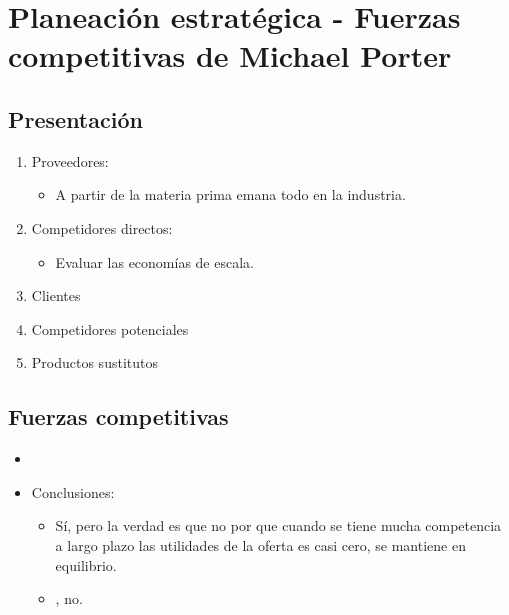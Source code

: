 \section{Planeación estratégica - Fuerzas competitivas de Michael Porter}
\subsection{Presentación}
\begin{enumerate}
    \item Proveedores: 
        \begin{itemize}
            \item A partir de la materia prima emana todo en la industria. 
        \end{itemize}
    
    \item Competidores directos: 
        \begin{itemize}
            \item Evaluar las economías de escala.
        \end{itemize}
    
    \item Clientes
    \item Competidores potenciales 
    \item Productos sustitutos 
\end{enumerate}

\subsection{Fuerzas competitivas}
\begin{itemize}
    \item {} 
    \item Conclusiones: 
        \begin{itemize}
            \item {} Sí, pero la verdad es que no por que cuando se tiene mucha competencia a largo plazo las utilidades de la oferta es casi cero, se mantiene en equilibrio. 
            \item {}, no. 
        \end{itemize}
\end{itemize}

